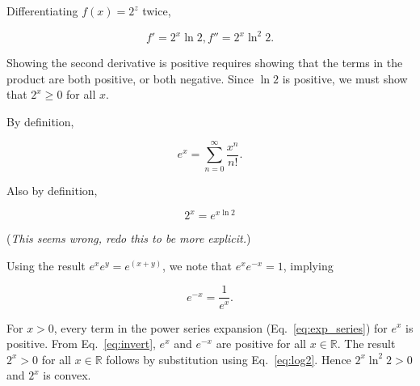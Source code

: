 \documentclass{article}
\begin{document}
Differentiating $f(x) = 2^z$ twice,

\begin{equation}
  f' = 2^x \ln 2, f'' = 2^x\ln^2 2.
\end{equation}

Showing the second derivative is positive requires showing that the
terms in the product are both positive, or both negative. Since $\ln 2$
is positive, we must show that $2^x \geq 0$ for all $x$.

By definition,

\begin{equation}\label{eq:exp_series}
  e^x = \sum_{n=0}^\infty \frac{x^n}{n!}.
\end{equation}

Also by definition,

\begin{equation}\label{eq:log2}
  2^x = e^{x\ln 2}
\end{equation}

(\textit{This seems wrong, redo this to be more explicit.})

Using the result $e^xe^y = e^{(x+y)}$, we note that $e^xe^{-x} = 1$, implying

\begin{equation}\label{eq:invert}
  e^{-x} = \frac{1}{e^x}.
\end{equation}

For $x > 0$, every term in the power series expansion
(Eq.~\ref{eq:exp_series}) for $e^x$ is positive.
From Eq.~\ref{eq:invert}, $e^x$ and $e^{-x}$ are positive for all $x\in\mathbb{R}$. The result
$2^x > 0$ for all $x\in\mathbb{R}$ follows by substitution using
Eq.~\ref{eq:log2}. Hence $2^x\ln^2 2 > 0$ and $2^x$ is convex.

\begin{comment}
Substituting and expanding:

\begin{equation}
  2^x = 1 + x\ln 2 + \frac{x^2 \ln^2 2}{2!} + \frac{x^3 \ln^3 2}{3!} + \cdots.
\end{equation}

For $x > 0, 2^x$ is clearly positive. For $x = 0, 2^0 = 1$, again positive. When $x < 0$,

\begin{equation}
  2^{-x} = 1 - x\ln 2 + \frac{x^2 \ln^2 2}{2!} - \frac{x^3 \ln^3 2}{3!} + \frac{x^4 \ln^4 2}{4!}
  - \frac{x^5 \ln^5 2}{5!} + \cdots.
\end{equation}
\end{comment}
\end{document}
